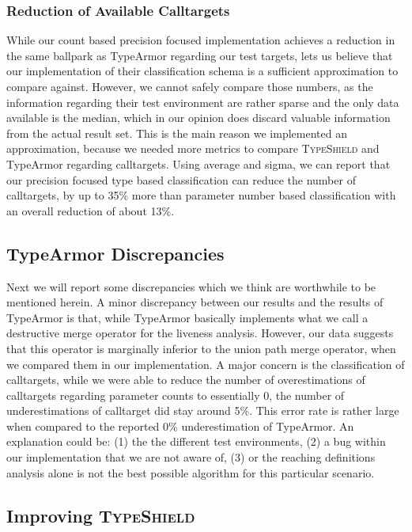 \subsubsection{Reduction of Available Calltargets}
While our count based precision focused implementation achieves a reduction in the same ballpark as
TypeArmor regarding our test targets, lets us believe that our implementation of their classification
schema is a sufficient approximation to compare against. However, we cannot safely compare those numbers,
as the information regarding their test environment are rather sparse and the only data available is the
median, which in our opinion does discard valuable information from the actual result set. This is the
main reason we implemented an approximation, because we needed more metrics to compare \textsc{TypeShield}
and TypeArmor regarding calltargets. Using average and sigma, we can report that our precision focused
type based classification can reduce the number of calltargets, by up to 35\% more than parameter number
based classification with an overall reduction of about 13\%.

\subsection{TypeArmor Discrepancies}
\label{section:discrep}
Next we will report some discrepancies which we think are worthwhile to be mentioned herein.
A minor discrepancy between our results and the results of TypeArmor is that, while TypeArmor basically implements
what we call a destructive merge operator for the liveness analysis. However, our data suggests that this
operator is marginally inferior to the union path merge operator, when we compared them in our implementation.
A major concern is the classification of calltargets, while we were able to reduce the number of overestimations
of calltargets regarding parameter counts to essentially 0, the number of underestimations of calltarget did
stay around 5\%. This error rate is rather large when compared to the reported 0\% underestimation
of TypeArmor. An explanation could be: 
(1) the the different test environments, 
(2) a bug within our implementation that we are not aware of, 
(3) or the reaching definitions analysis alone is not the best possible algorithm for this particular scenario.

\subsection{Improving \textsc{TypeShield}}
\label{section:venuesimp}

